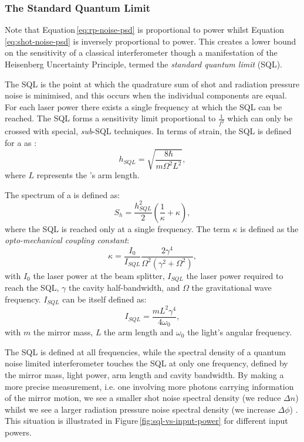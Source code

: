 \subsubsection{\label{sec:sql}The Standard Quantum Limit}
Note that Equation\,\ref{eq:rp-noise-psd} is proportional to power whilst Equation\,\ref{eq:shot-noise-psd} is inversely proportional to power. This creates a lower bound on the sensitivity of a classical interferometer though a manifestation of the Heisenberg Uncertainty Principle, termed the \emph{standard quantum limit} (\gls{SQL}).

The \gls{SQL} is the point at which the quadrature sum of shot and radiation pressure noise is minimised, and this occurs when the individual components are equal. For each laser power there exists a single frequency at which the \gls{SQL} can be reached. The \gls{SQL} forms a sensitivity limit proportional to $\frac{1}{f^2}$ which can only be crossed with special, \emph{sub}-\gls{SQL} techniques. In terms of strain, the \gls{SQL} is defined for a \MI{} as \cite{Braginsky1996}:
\begin{equation}
  \label{eq:strainsql}
  h_{SQL} = \sqrt{\frac{8 \hbar}{m \Omega^2 L^2}},
\end{equation}
where $L$ represents the \MI{}'s arm length.

The spectrum of a \MI{} is defined as:
\begin{equation}
  \label{eq:classicalifospectrum}
  S_h = \frac{h^{2}_{SQL}}{2} \left( \frac{1}{\kappa} + \kappa \right),
\end{equation}
where the \gls{SQL} is reached only at a single frequency. The term $\kappa$ is defined as the \emph{opto-mechanical coupling constant}:
\begin{equation}
 \kappa = \frac{I_0}{I_{SQL}} \frac{2 \gamma^4}{\Omega^2 \left( \gamma^2 +
\Omega^2 \right)},
 \label{eq:optomechanicalcoupling}
\end{equation}
with $I_0$ the laser power at the beam splitter, $I_{SQL}$ the laser power required to reach the \gls{SQL}, $\gamma$ the cavity half-bandwidth, and $\Omega$ the gravitational wave frequency. $I_{SQL}$ can be itself defined as:
\begin{equation}
 I_{SQL} = \frac{m L^2 \gamma^4}{4 \omega_0},
\end{equation}
with $m$ the mirror mass, $L$ the arm length and $\omega_0$ the light's angular frequency.

The \gls{SQL} is defined at all frequencies, while the spectral density of a quantum noise limited interferometer touches the \gls{SQL} at only one frequency, defined by the mirror mass, light power, arm length and cavity bandwidth. By making a more precise measurement, i.e. one involving more photons carrying information of the mirror motion, we see a smaller shot noise spectral density (we reduce $\Delta n$) whilst we see a larger radiation pressure noise spectral density (we increase $\Delta \phi$) \cite{Caves1981}. This situation is illustrated in Figure\,\ref{fig:sql-vs-input-power} for different input powers.

